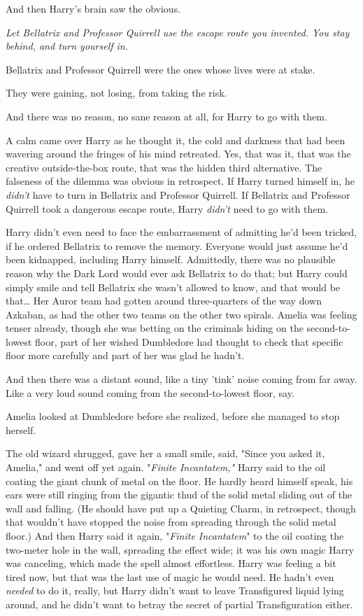 And then Harry's brain saw the obvious.

\emph{Let Bellatrix and Professor Quirrell use the escape route you invented. 
You stay behind, and turn yourself in.}

Bellatrix and Professor Quirrell were the ones whose lives were at stake.

They were gaining, not losing, from taking the risk.

And there was no reason, no sane reason at all, for Harry to go with them.

A calm came over Harry as he thought it, the cold and darkness that had been 
wavering around the fringes of his mind retreated. Yes, that was it, that was 
the creative outside-the-box route, that was the hidden third alternative. The 
falseness of the dilemma was obvious in retrospect. If Harry turned himself in, 
he \emph{didn't} have to turn in Bellatrix and Professor Quirrell. If Bellatrix 
and Professor Quirrell took a dangerous escape route, Harry \emph{didn't} need 
to go with them.

Harry didn't even need to face the embarrassment of admitting he'd been 
tricked, if he ordered Bellatrix to remove the memory. Everyone would just 
assume he'd been kidnapped, including Harry himself. Admittedly, there was no 
plausible reason why the Dark Lord would ever ask Bellatrix to do that; but 
Harry could simply smile and tell Bellatrix she wasn't allowed to know, and 
that would be that{\ldots}
\sbreak
Her Auror team had gotten around three-quarters of the way down Azkaban, as had 
the other two teams on the other two spirals. Amelia was feeling tenser 
already, though she was betting on the criminals hiding on the second-to-lowest 
floor, part of her wished Dumbledore had thought to check that specific floor 
more carefully and part of her was glad he hadn't.

And then there was a distant sound, like a tiny 'tink' noise coming from far 
away. Like a very loud sound coming from the second-to-lowest floor, say.

Amelia looked at Dumbledore before she realized, before she managed to stop 
herself.

The old wizard shrugged, gave her a small smile, said, "Since you asked it, 
Amelia," and went off yet again.
\sbreak
"\emph{Finite Incantatem,"} Harry said to the oil coating the giant chunk of 
metal on the floor. He hardly heard himself speak, his ears were still ringing 
from the gigantic thud of the solid metal sliding out of the wall and falling. 
(He should have put up a Quieting Charm, in retrospect, though that wouldn't 
have stopped the noise from spreading through the solid metal floor.) And then 
Harry said it again, "\emph{Finite Incantatem}" to the oil coating the 
two-meter hole in the wall, spreading the effect wide; it was his own magic 
Harry was canceling, which made the spell almost effortless. Harry was feeling 
a bit tired now, but that was the last use of magic he would need. He hadn't 
even \emph{needed} to do it, really, but Harry didn't want to leave 
Transfigured liquid lying around, and he didn't want to betray the secret of 
partial Transfiguration either.

